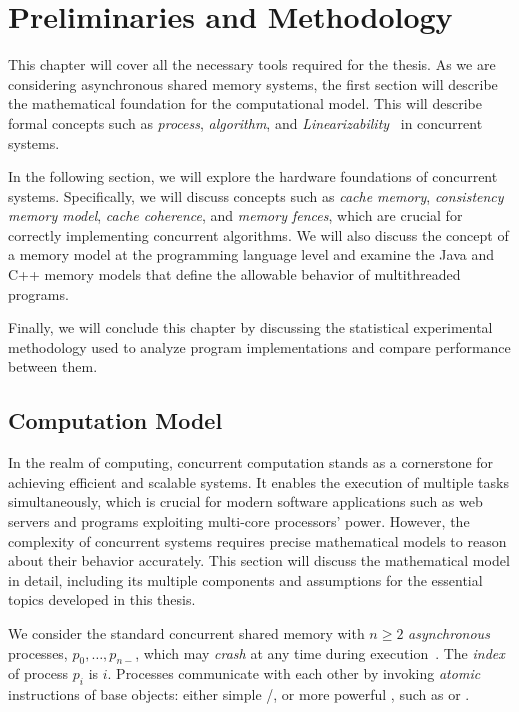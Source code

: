\chapter{\label{chapter:3_preliminaries}Preliminaries and Methodology}

This chapter will cover all the necessary tools required for the thesis. As we are considering asynchronous shared memory systems, the first section will describe the mathematical foundation for the computational model. This will describe formal concepts such as \emph{process}, \emph{algorithm}, and \emph{Linearizability}~\cite{DBLP_journals_toplas_HerlihyW90} in concurrent systems.

In the following section, we will explore the hardware foundations of concurrent systems. Specifically, we will discuss concepts such as \emph{cache memory}, \emph{consistency memory model}, \emph{cache coherence}, and \emph{memory fences}, which are crucial for correctly implementing concurrent algorithms. We will also discuss the concept of a memory model at the programming language level and examine the Java and C++ memory models that define the allowable behavior of multithreaded programs.

Finally, we will conclude this chapter by discussing the statistical experimental methodology used to analyze program implementations and compare performance between them.

\section{\label{sec:chapter-3:computation-model}Computation Model}

In the realm of computing, concurrent computation stands as a cornerstone for achieving efficient and scalable systems. It enables the execution of multiple tasks simultaneously, which is crucial for modern software applications such as web servers and programs exploiting multi-core processors' power. However, the complexity of concurrent systems requires precise mathematical models to reason about their behavior accurately. This section will discuss the mathematical model in detail, including its multiple components and assumptions for the essential topics developed in this thesis.

We consider the standard concurrent shared memory with \(n \ge 2\) \textit{asynchronous} processes, \(p_0, \ldots, p_{n-}\), which may \textit{crash} at any time during execution~\cite{DBLP_conf_spaa_Herlihy91,DBLP_books_daglib_0020056,DBLP_journals_toplas_HerlihyW90}. The \textit{index} of process \(p_i\) is \(i\). Processes communicate with each other by invoking \textit{atomic} instructions of base objects: either simple \R/\W, or more powerful \RMW, such as \SWAP or \CAS.

